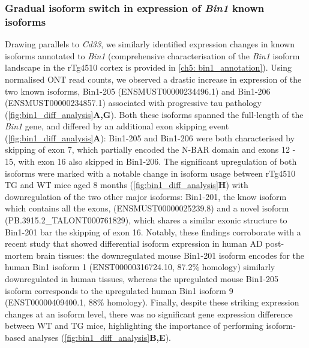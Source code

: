 \subsubsection{Gradual isoform switch in expression of \textit{Bin1} known isoforms}
Drawing parallels to \textit{Cd33}, we similarly identified expression changes in known isoforms annotated to \textit{Bin1} (comprehensive characterisation of the \textit{Bin1} isoform landscape in the rTg4510 cortex is provided in \cref{ch5: bin1_annotation}). Using normalised ONT read counts, we observed a drastic increase in expression of the two known isoforms, Bin1-205 (ENSMUST00000234496.1) and Bin1-206 (ENSMUST00000234857.1) associated with progressive tau pathology (\cref{fig:bin1_diff_analysis}\textbf{A,G}). Both these isoforms spanned the full-length of the \textit{Bin1} gene, and differed by an additional exon skipping event (\cref{fig:bin1_diff_analysis}\textbf{A}): Bin1-205 and Bin1-206 were both characterised by skipping of exon 7, which partially encoded the N-BAR domain and exons 12 - 15, with exon 16 also skipped in Bin1-206. The significant upregulation of both isoforms were marked with a notable change in isoform usage between rTg4510 TG and WT mice aged 8 months (\cref{fig:bin1_diff_analysis}\textbf{H}) with downregulation of the two other major isoforms: Bin1-201, the know isoform which contains all the exons, (ENSMUST00000025239.8) and a novel isoform (PB.3915.2\_TALONT000761829), which shares a similar exonic structure to Bin1-201 bar the skipping of exon 16. Notably, these findings corroborate with a recent study that showed differential isoform expression in human AD post-mortem brain tissues\cite{Taga2020}: the downregulated mouse Bin1-201 isoform encodes for the human Bin1 isoform 1 (ENST00000316724.10, 87.2\% homology) similarly downregulated in human tissues, whereas the upregulated mouse Bin1-205 isoform corresponds to the upregulated human Bin1 isoform 9 (ENST00000409400.1, 88\% homology). Finally, despite these striking expression changes at an isoform level, there was no significant gene expression difference between WT and TG mice, highlighting the importance of performing isoform-based analyses (\cref{fig:bin1_diff_analysis}\textbf{B,E}). 

